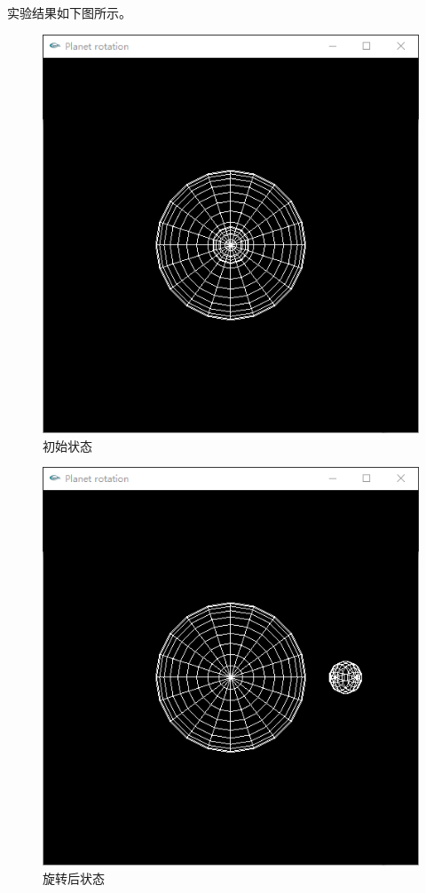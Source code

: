 \documentclass[logo,reportComp]{thesis}
\begin{document}
实验结果如下图所示。
\begin{figure}[H]
\centering
\includegraphics[width=0.6\linewidth]{fig/initial_state.png}
\caption{初始状态}
\end{figure}
\begin{figure}[H]
\centering
\includegraphics[width=0.6\linewidth]{fig/rotate_state.png}
\caption{旋转后状态}
\end{figure}
\end{document}
